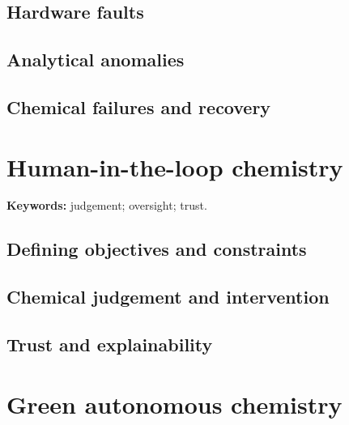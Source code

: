 \subsection{Hardware faults}


\subsection{Analytical anomalies}


\subsection{Chemical failures and recovery}


\section{Human-in-the-loop chemistry}

\begin{insightbox}
\textbf{Keywords:} judgement; oversight; trust.
\end{insightbox}

\subsection{Defining objectives and constraints}


\subsection{Chemical judgement and intervention}


\subsection{Trust and explainability}


\section{Green autonomous chemistry}

